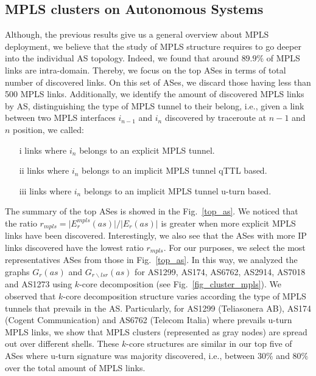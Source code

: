 \subsection{MPLS clusters on Autonomous Systems}\label{cluster.as}
Although, the previous results give us a general overview about MPLS deployment,
we believe that the study of MPLS structure requires to go deeper into the
individual AS topology. Indeed, we found that around $89.9\%$ of MPLS links are
intra-domain. Thereby, we focus on the top ASes in terms of total number of
discovered links.  On this set of ASes, we discard those having less than 500
MPLS links. Additionally, we identify the amount of discovered MPLS links by AS,
distinguishing the type of MPLS tunnel to their belong, i.e., given a link
between two MPLS interfaces $i_{n-1}$  and $i_{n}$ discovered by traceroute at
$n-1$ and $n$ position, we called:

\begin{itemize}
  \item[i]  links 
  where $i_{n}$ belongs  to an explicit MPLS tunnel.
  \item[ii]  links 
  where $i_{n}$ belongs  to an implicit MPLS tunnel qTTL based.
  \item[iii]  links 
  where $i_{n}$ belongs  to an implicit MPLS tunnel u-turn based.
\end{itemize}

The summary of the top ASes is showed in the Fig.~\ref{top_as}.
We noticed that the ratio $r_{mpls}= \vert E^{mpls}_{r} (as) \vert /\vert E_{r}
(as) \vert $  is greater when more explicit MPLS links have been discovered.
Interestingly, we also see that the ASes with more IP links discovered have the
lowest ratio $r_{mpls}$. For our purposes, we select the most representatives
ASes from those in Fig.~\ref{top_as}. In this way, we analyzed the graphs
$G_{r}(as)$ and $G_{r\backslash lsr}(as)$ for AS1299, AS174, AS6762, AS2914,
AS7018 and AS1273 using  $k$-core decomposition (see Fig.~\ref{fig_cluster_mpls}).
We observed that  $k$-core decomposition structure varies according
the type of MPLS tunnels that prevails in the AS. Particularly, for  AS1299 (Teliasonera AB), AS174 (Cogent Communication) and AS6762 (Telecom Italia) where prevails u-turn MPLS links,
we show that MPLS clusters (represented as gray nodes)  are spread out over different shells. These $k$-core structures are similar in our top five of ASes where u-turn signature was majority
discovered, i.e., between $30\%$ and  $80\%$ over  the total amount of MPLS
links. 

